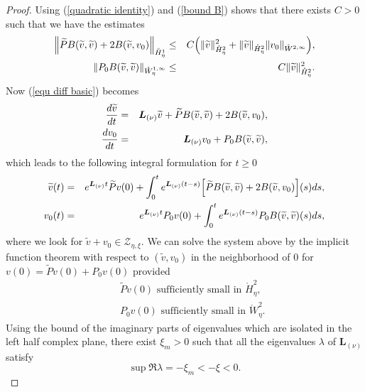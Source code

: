 \documentclass[11pt]{article}
\begin{document}
\begin{proof}
Using (\ref{quadratic identity}) and (\ref{bound B}) shows that there exists 
$C>0$ such that we have the estimates%
\begin{eqnarray*}
\Bigl\|\widetilde{P}B(\widetilde{v},\widetilde{v})+2B(\widetilde{v},v_{0})\Bigr\|_{%
\mathring{H}_{\eta}^{1}} &\leq &C \Bigl(\|\widetilde{v}\|_{\mathring{H}%
_{\eta}^{2}}^{2}+\|\widetilde{v}\|_{\mathring{H}_{\eta}^{2}}\|v_{0}\|_{\mathring{W}%
^{2,\infty }} \Bigr), \\
\|P_{0}B(\widetilde{v},\widetilde{v})\|_{\mathring{W}_{\eta}^{1,\infty }} &\leq
&C\|\widetilde{v}\|_{\mathring{H}_{\eta}^{2}}^{2}.
\end{eqnarray*}
Now (\ref{equ diff basic}) becomes%
\begin{eqnarray*}
\frac{d\widetilde{v}}{dt} &=&\boldsymbol{L}_{(\nu )}\widetilde{v}+\widetilde{%
P}B(\widetilde{v},\widetilde{v})+2B(\widetilde{v},v_{0}), \\
\frac{dv_{0}}{dt} &=&\boldsymbol{L}_{(\nu )}v_{0}+P_{0}B(\widetilde{v},%
\widetilde{v}),
\end{eqnarray*}%
which leads to the following integral formulation for $t\geq 0$%
\begin{eqnarray}
\widetilde{v}(t) &=&e^{\boldsymbol{L}_{(\nu )}t}\widetilde{P}%
v(0)+\int_{0}^{t}e^{\boldsymbol{L}_{(\nu )}(t-s)} \Bigl[\widetilde{P}B(\widetilde{v%
},\widetilde{v})+2B(\widetilde{v},v_{0}) \Bigr](s)ds,  \label{compvtilde} \\
v_{0}(t) &=&e^{\boldsymbol{L}_{(\nu )}t}P_{0}v(0)+\int_{0}^{t}e^{\boldsymbol{%
L}_{(\nu )}(t-s)}P_{0}B(\widetilde{v},\widetilde{v})(s)ds,  \label{compv0}
\end{eqnarray}%
where we look for $\widetilde{v}+v_{0}\in \mathcal{Z}_{\eta,\xi }.$ 
We can solve the system above by the implicit function theorem with respect
to $(\widetilde{v},v_{0})$ in the neighborhood of $0$ for $v(0)=\widetilde{P}%
v(0)+P_{0}v(0)$ provided 
\begin{eqnarray*}
&&\widetilde{P}v(0)\text{ sufficiently small in }\mathring{H}_{\eta}^{2}, \\
&&P_{0}v(0)\text{ sufficiently small in }\mathring{W}_{\eta}^{2}.
\end{eqnarray*}
Using the bound of the imaginary parts of eigenvalues which are isolated in
the left half complex plane, there exist $\xi_{m}>0$
such that all the eigenvalues $\lambda $ of $\boldsymbol{L}_{(\nu )}$ satisfy%
\begin{equation*}
\sup \Re \lambda =-\xi_{m} <-\xi  <0.
\end{equation*}%

\end{proof}
\end{document}
